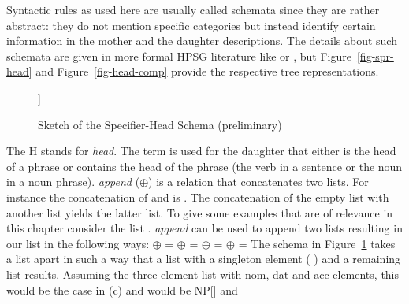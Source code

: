 Syntactic rules as used here are usually called schemata since they are rather abstract: they do not
mention specific categories but instead identify certain information in the mother and the daughter descriptions.
The details about such schemata are given in more formal HPSG literature like
 or , 
but Figure~\vref{fig-spr-head} and
Figure~\vref{fig-head-comp} provide the respective tree representations.
\begin{figure}
\begin{forest}
[H\feattab{\spr \ibox{1}}%
  [\ibox{2}]
  [H\feattab{\spr \ibox{1} $\oplus$ \sliste{ \ibox{2} },\\
             \comps \eliste}
  ]]
\end{forest}
\caption{\label{fig-spr-head}Sketch of the Specifier-Head Schema (preliminary)}
\end{figure}
The H stands for \emph{head}. The term  is used for the daughter that either is
the head of a phrase or contains the head of the phrase (\eg the verb in a sentence or the noun in a
noun phrase). \emph{append} ($\oplus$) is a relation that concatenates two 
lists. For instance the concatenation of  and  is
. The concatenation of the empty list \eliste{} with another list yields
the latter list. To give some examples that are of relevance in this chapter consider the list
. \emph{append} can be used to append two
lists resulting in our list in the following ways:
\eal
\ex \eliste{} $\oplus$  = 
\ex {} $\oplus$  = 
\ex {} $\oplus$  = 
\ex {} $\oplus$ \eliste{} = 
\zl
The schema in Figure~\ref{fig-spr-head} takes a list apart in such a way that a list with a
singleton element (  ) and a remaining list  results. Assuming the
three-element list with nom, dat and acc elements, this would be the case in (c) and  would be NP[] and
